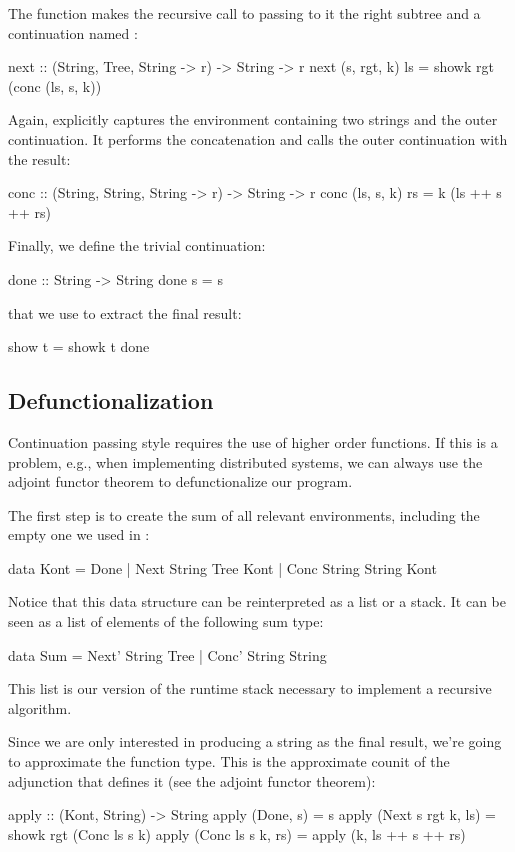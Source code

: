 \documentclass[DaoFP]{subfiles}
\begin{document}
The function  makes the recursive call to  passing to it the right subtree and a continuation named :
\begin{haskell}
next :: (String, Tree, String -> r) -> String -> r
next (s, rgt, k) ls = showk rgt (conc (ls, s, k))
\end{haskell}
Again,  explicitly captures the environment containing two strings and the outer continuation. It performs the concatenation and calls the outer continuation with the result:
\begin{haskell}
conc :: (String, String, String -> r) -> String -> r
conc (ls, s, k) rs = k (ls ++ s ++ rs)
\end{haskell}
Finally, we define the trivial continuation:
\begin{haskell}
done :: String -> String
done s = s
\end{haskell}
that we use to extract the final result:
\begin{haskell}
show t = showk t done
\end{haskell}

\subsection{Defunctionalization}

Continuation passing style requires the use of higher order functions. If this is a problem, e.g., when implementing distributed systems, we can always use the adjoint functor theorem to defunctionalize our program. 

The first step is to create the sum of all relevant environments, including the empty one we used in :
\begin{haskell}
data Kont = Done 
          | Next String Tree Kont 
          | Conc String String Kont
\end{haskell}
Notice that this data structure can be reinterpreted as a list or a stack. It can be seen as a list of elements of the following sum type:
\begin{haskell}
data Sum = Next' String Tree  | Conc' String String 
\end{haskell}
This list is our version of the runtime stack necessary to implement a recursive algorithm. 

Since we are only interested in producing a string as the final result, we're going to approximate the  function type. This is the approximate counit of the adjunction that defines it (see the adjoint functor theorem):
\begin{haskell}
apply :: (Kont, String) -> String
apply (Done, s) = s
apply (Next s rgt k, ls) = showk rgt (Conc ls s k)
apply (Conc ls s k, rs) = apply (k, ls ++ s ++ rs)
\end{haskell}
\end{document}
